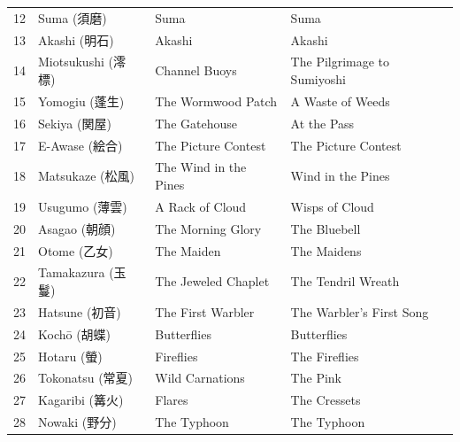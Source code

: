 \documentclass{article}
\begin{document}
\begin{table}
\begin{tabular}{llll}
		12          & Suma (須磨)              & Suma                                & Suma                          \\
		13          & Akashi (明石)            & Akashi                              & Akashi                        \\
		14          & Miotsukushi (澪標)       & Channel Buoys                       & The Pilgrimage to Sumiyoshi   \\
		15          & Yomogiu (蓬生)           & The Wormwood Patch                  & A Waste of Weeds              \\
		16          & Sekiya (関屋)            & The Gatehouse                       & At the Pass                   \\
		17          & E-Awase (絵合)           & The Picture Contest                 & The Picture Contest           \\
		18          & Matsukaze (松風)         & The Wind in the Pines               & Wind in the Pines             \\
		19          & Usugumo (薄雲)           & A Rack of Cloud                     & Wisps of Cloud                \\
		20          & Asagao (朝顔)            & The Morning Glory                   & The Bluebell                  \\
		21          & Otome (乙女)             & The Maiden                          & The Maidens                   \\
		22          & Tamakazura (玉鬘)        & The Jeweled Chaplet                 & The Tendril Wreath            \\
		23          & Hatsune (初音)           & The First Warbler                   & The Warbler's First Song      \\
		24          & Kochō (胡蝶)             & Butterflies                         & Butterflies                   \\
		25          & Hotaru (螢)             & Fireflies                           & The Fireflies                 \\
		26          & Tokonatsu (常夏)         & Wild Carnations                     & The Pink                      \\
		27          & Kagaribi (篝火)          & Flares                              & The Cressets                  \\
		28          & Nowaki (野分)            & The Typhoon                         & The Typhoon                   \\

\end{tabular}
\end{table}
\end{document}
